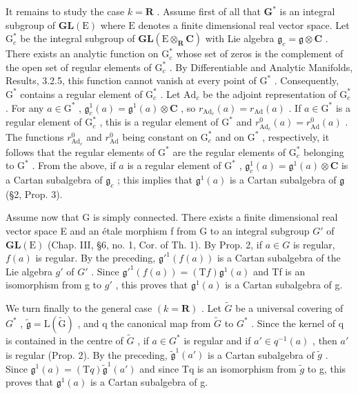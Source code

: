 It remains to study the case \(k = \mathbf{R}\) . Assume first of all that \(\mathbf{G}^*\) is an integral subgroup of \(\mathbf{GL}(\mathrm{E})\) where \(\mathrm{E}\) denotes a finite dimensional real vector space. Let \(\mathrm{G}_c^*\) be the integral subgroup of \(\mathbf{GL}(\mathrm{E} \otimes_{\mathbf{R}} \mathbf{C})\) with Lie algebra \(\mathfrak{g}_c = \mathfrak{g} \otimes \mathbf{C}\) . There exists an analytic function on \(\mathrm{G}_c^*\) whose set of zeros is the complement of the open set of regular elements of \(\mathrm{G}_c^*\) . By Differentiable and Analytic Manifolds, Results, 3.2.5, this function cannot vanish at every point of \(\mathrm{G}^*\) . Consequently, \(\mathrm{G}^*\) contains a regular element of \(\mathrm{G}_c^*\) . Let \(\mathrm{Ad}_c\) be the adjoint representation of \(\mathrm{G}_c^*\) . For any \(a \in \mathrm{G}^*\) , \(\mathfrak{g}_c^1(a) = \mathfrak{g}^1(a) \otimes \mathbf{C}\) , so \(r_{\mathrm{Ad}_c}(a) = r_{\mathrm{Ad}}(a)\) . If \(a \in \mathrm{G}^*\) is a regular element of \(\mathrm{G}_c^*\) , this is a regular element of \(\mathrm{G}^*\) and \(r_{\mathrm{Ad}_c}^0(a) = r_{\mathrm{Ad}}^0(a)\) . The functions \(r_{\mathrm{Ad}_c}^0\) and \(r_{\mathrm{Ad}}^0\) being constant on \(\mathrm{G}_c^*\) and on \(\mathrm{G}^*\) , respectively, it follows that the regular elements of \(\mathrm{G}^*\) are the regular elements of \(\mathrm{G}_c^*\) belonging to \(\mathrm{G}^*\) . From the above, if \(a\) is a regular element of \(\mathrm{G}^*\) , \(\mathfrak{g}_c^1(a) = \mathfrak{g}^1(a) \otimes \mathbf{C}\) is a Cartan subalgebra of \(\mathfrak{g}_c\) ; this implies that \(\mathfrak{g}^1(a)\) is a Cartan subalgebra of \(\mathfrak{g}\) (§2, Prop. 3).

Assume now that G is simply connected. There exists a finite dimensional real vector space E and an étale morphism f from G to an integral subgroup \(G'\) of \(\mathbf{GL}(\mathrm{E})\) (Chap. III, §6, no. 1, Cor. of Th. 1). By Prop. 2, if \(a \in G\) is regular, \(f(a)\) is regular. By the preceding, \(\mathfrak{g}'^{1}(f(a))\) is a Cartan subalgebra of the Lie algebra \(g'\) of \(G'\) . Since \(\mathfrak{g}'^{1}(f(a)) = (\mathrm{T}f)\mathfrak{g}^{1}(a)\) and Tf is an isomorphism from g to \(g'\) , this proves that \(\mathfrak{g}^{1}(a)\) is a Cartan subalgebra of g.

We turn finally to the general case \((k = \mathbf{R})\) . Let \(\tilde{G}\) be a universal covering of \(G^{*}\) , \(\tilde{\mathfrak{g}} = \mathrm{L}(\tilde{\mathrm{G}})\) , and q the canonical map from \(\tilde{G}\) to \(G^{*}\) . Since the kernel of q is contained in the centre of \(\tilde{G}\) , if \(a \in G^{*}\) is regular and if \(a' \in q^{-1}(a)\) , then \(a'\) is regular (Prop. 2). By the preceding, \(\tilde{\mathfrak{g}}^{1}(a')\) is a Cartan subalgebra of \(\tilde{g}\) . Since \(\mathfrak{g}^{1}(a) = (\mathrm{T}q)\tilde{\mathfrak{g}}^{1}(a')\) and since Tq is an isomorphism from \(\tilde{g}\) to g, this proves that \(\mathfrak{g}^{1}(a)\) is a Cartan subalgebra of g.

